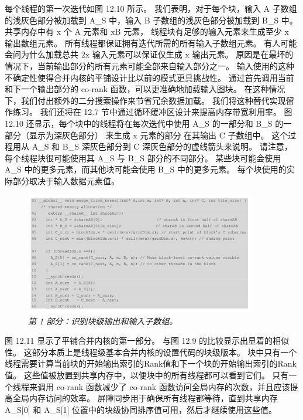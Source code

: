 每个线程的第一次迭代如图 12.10 所示。 
我们表明，对于每个块，输入 A 子数组的浅灰色部分被加载到 A\_S 中，输入 B 子数组的浅灰色部分被加载到 B\_S 中。 
共享内存中有 x 个 A 元素和 $\mathrm{x} \mathrm{B}$ 元素，
线程块有足够的输入元素来生成至少 $\mathrm{x}$ 输出数组元素。 
所有线程都保证拥有迭代所需的所有输入子数组元素。 
有人可能会问为什么加载总共 $2 \mathrm{x}$ 输入元素可以保证仅生成 $\mathrm{x}$ 输出元素。 
原因是在最坏的情况下，当前输出部分的所有元素可能全部来自输入部分之一。 
输入使用的这种不确定性使得合并内核的平铺设计比以前的模式更具挑战性。 
通过首先调用当前和下一个输出部分的 co-rank 函数，可以更准确地加载输入图块。 
在这种情况下，我们付出额外的二分搜索操作来节省冗余数据加载。 我们将这种替代实现留作练习。 
我们还将在 12.7 节中通过循环缓冲区设计来提高内存带宽利用率。 
图 12.10 还显示，每个块中的线程将在每次迭代中使用 A\_S 的一部分和 B\_S 的一部分（显示为深灰色部分）
来生成 $\mathrm{x}$ 元素的部分 在其输出 $\mathrm{C}$ 子数组中。 
这个过程用从 A\_S 和 B\_S 深灰色部分到 C 深灰色部分的虚线箭头来说明。 
请注意，每个线程块很可能使用其 A\_S 与 B\_S 部分的不同部分。 
某些块可能会使用 A\_S 中的更多元素，而其他块可能会使用 B\_S 中的更多元素。 每个块使用的实际部分取决于输入数据元素值。

\begin{figure}[H]
	\centering
	\includegraphics[width=0.9\textwidth]{figs/F12.11.png}
	\caption{\textit{第 1 部分：识别块级输出和输入子数组。}}
\end{figure}

图 12.11 显示了平铺合并内核的第一部分。 与图 12.9 的比较显示出显着的相似性。 
这部分本质上是线程级基本合并内核的设置代码的块级版本。 
块中只有一个线程需要计算当前块的开始输出索引的Rank值和下一个块的开始输出索引的Rank值。 
这些值被放置到共享内存中，以便块中的所有线程都可以看到它们。 
只有一个线程来调用 co-rank 函数减少了 co-rank 函数访问全局内存的次数，并且应该提高全局内存访问的效率。 
屏障同步用于确保所有线程都等待，直到共享内存 A\_S[0] 和 A\_S[1] 位置中的块级协同排序值可用，然后才继续使用这些值。

